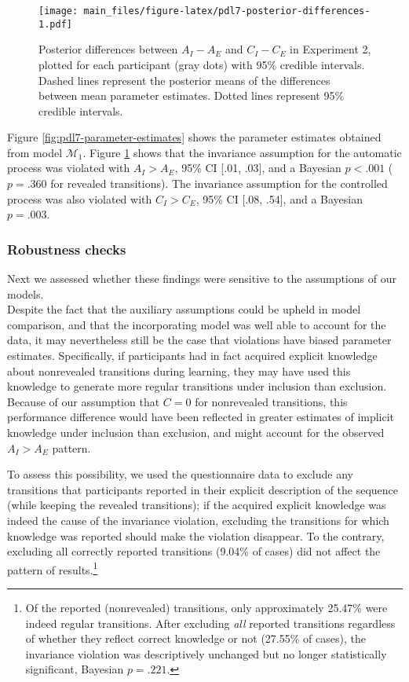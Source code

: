\documentclass[man]{apa6}
\theoremstyle{definition}
\theoremstyle{definition}
\theoremstyle{definition}
\theoremstyle{remark}
\begin{document}
\begin{figure}[htbp]
\centering
\texttt{[image: main\_files/figure-latex/pdl7-posterior-differences-1.pdf]}
\caption{\label{fig:pdl7-posterior-differences}Posterior differences between
\(A_I - A_E\) and \(C_I - C_E\) in Experiment 2, plotted for each
participant (gray dots) with 95\% credible intervals. Dashed lines
represent the posterior means of the differences between mean parameter
estimates. Dotted lines represent 95\% credible intervals.}
\end{figure}

Figure \ref{fig:pdl7-parameter-estimates} shows the parameter estimates
obtained from model \(\mathcal{M}_1\). Figure
\ref{fig:pdl7-posterior-differences} shows that the invariance
assumption for the automatic process was violated with \(A_I > A_E\),
95\% CI {[}.01, .03{]}, and a Bayesian \(p < .001\) (\(p = .360\) for
revealed transitions). The invariance assumption for the controlled
process was also violated with \(C_I > C_E\), 95\% CI {[}.08, .54{]},
and a Bayesian \(p = .003\).

\subsubsection{Robustness checks}\label{robustness-checks}

Next we assessed whether these findings were sensitive to the
assumptions of our models.\\
Despite the fact that the auxiliary assumptions could be upheld in model
comparison, and that the incorporating model was well able to account
for the data, it may nevertheless still be the case that violations have
biased parameter estimates. Specifically, if participants had in fact
acquired explicit knowledge about nonrevealed transitions during
learning, they may have used this knowledge to generate more regular
transitions under inclusion than exclusion. Because of our assumption
that \(C = 0\) for nonrevealed transitions, this performance difference
would have been reflected in greater estimates of implicit knowledge
under inclusion than exclusion, and might account for the observed
\(A_{I} > A_{E}\) pattern.

To assess this possibility, we used the questionnaire data to exclude
any transitions that participants reported in their explicit description
of the sequence (while keeping the revealed transitions); if the
acquired explicit knowledge was indeed the cause of the invariance
violation, excluding the transitions for which knowledge was reported
should make the violation disappear. To the contrary, excluding all
correctly reported transitions (9.04\% of cases) did not affect the
pattern of results.\footnote{Of the reported (nonrevealed) transitions,
  only approximately 25.47\% were indeed regular transitions. After
  excluding \emph{all} reported transitions regardless of whether they
  reflect correct knowledge or not (27.55\% of cases), the invariance
  violation was descriptively unchanged but no longer statistically
  significant, Bayesian \(p = .221\).}
\end{document}
